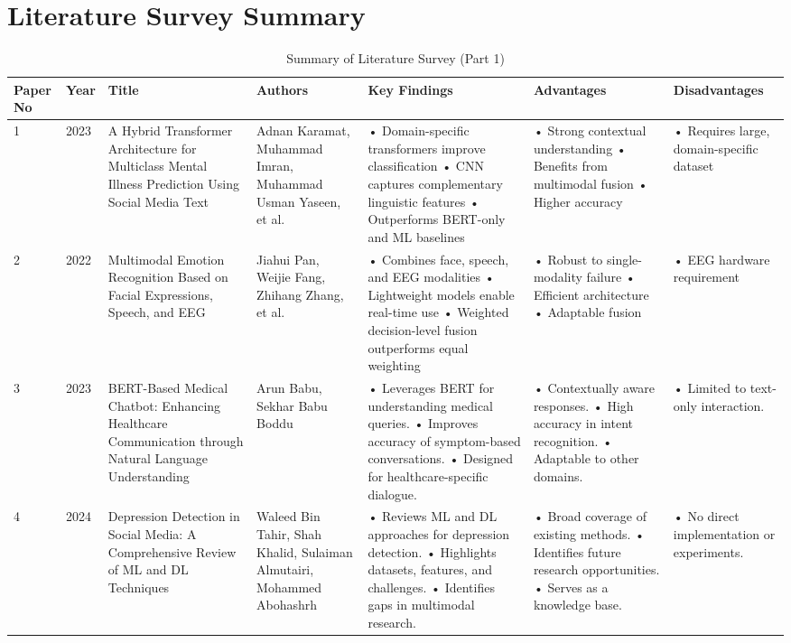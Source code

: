 \documentclass[11pt]{report}
\begin{document}
\newpage
\enlargethispage{3cm}
\section{Literature Survey Summary}
\begin{table}[H]
\centering
\caption{Summary of Literature Survey (Part 1)}
\label{tab:literature_survey_1}
\hspace*{-0.5cm}
\begin{tabular}{|p{0.8cm}|p{0.8cm}|p{2.8cm}|p{2.5cm}|p{3.2cm}|p{2.5cm}|p{2.2cm}|}
\hline
Paper No & Year & Title & Authors & Key Findings & Advantages & Disadvantages \\ 
\hline
1 & 2023 & A Hybrid Transformer Architecture for Multiclass Mental Illness Prediction Using Social Media Text & Adnan Karamat, Muhammad Imran, Muhammad Usman Yaseen, et al. & • Domain-specific transformers improve classification  • CNN captures complementary linguistic features • Outperforms BERT-only and ML baselines & • Strong contextual understanding • Benefits from multimodal fusion • Higher accuracy & • Requires large, domain-specific dataset \\ 
\hline
2 & 2022 & Multimodal Emotion Recognition Based on Facial Expressions, Speech, and EEG & Jiahui Pan, Weijie Fang, Zhihang Zhang, et al. & • Combines face, speech, and EEG modalities • Lightweight models enable real-time use • Weighted decision-level fusion outperforms equal weighting & • Robust to single-modality failure • Efficient architecture • Adaptable fusion & • EEG hardware requirement \\ 
\hline
3 & 2023 & BERT-Based Medical Chatbot: Enhancing Healthcare Communication through Natural Language Understanding & Arun Babu, Sekhar Babu Boddu & • Leverages BERT for understanding medical queries.
• Improves accuracy of symptom-based conversations.
• Designed for healthcare-specific dialogue. & • Contextually aware responses.
• High accuracy in intent recognition.
• Adaptable to other domains. & • Limited to text-only interaction. \\ 
\hline
4 & 2024 & Depression Detection in Social Media: A Comprehensive Review of ML and DL Techniques & Waleed Bin Tahir, Shah Khalid, Sulaiman Almutairi, Mohammed Abohashrh & • Reviews ML and DL approaches for depression detection.
• Highlights datasets, features, and challenges.
• Identifies gaps in multimodal research. & • Broad coverage of existing methods.
• Identifies future research opportunities.
• Serves as a knowledge base. & • No direct implementation or experiments. \\ 
\hline
\end{tabular}
\end{table}
\end{document}
